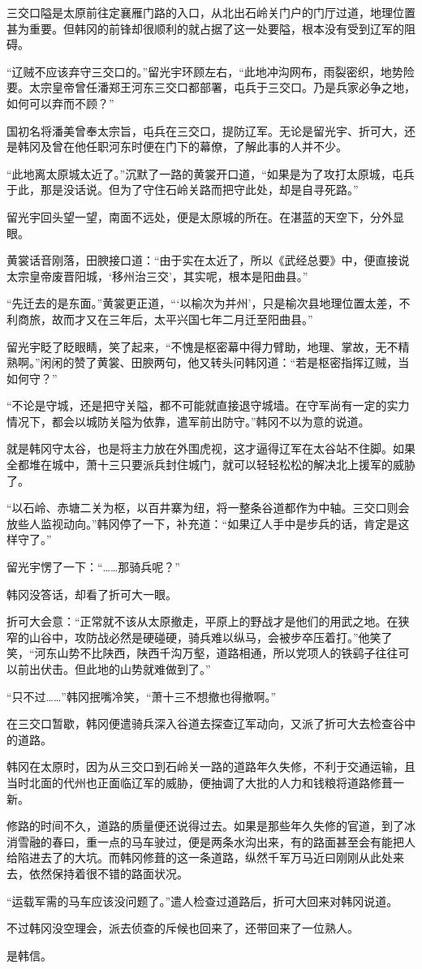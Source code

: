 三交口隘是太原前往定襄雁门路的入口，从北出石岭关门户的门厅过道，地理位置甚为重要。但韩冈的前锋却很顺利的就占据了这一处要隘，根本没有受到辽军的阻碍。

“辽贼不应该弃守三交口的。”留光宇环顾左右，“此地冲沟网布，雨裂密织，地势险要。太宗皇帝曾任潘郑王河东三交口都部署，屯兵于三交口。乃是兵家必争之地，如何可以弃而不顾？”

国初名将潘美曾奉太宗旨，屯兵在三交口，提防辽军。无论是留光宇、折可大，还是韩冈及曾在他任职河东时便在门下的幕僚，了解此事的人并不少。

“此地离太原城太近了。”沉默了一路的黄裳开口道，“如果是为了攻打太原城，屯兵于此，那是没话说。但为了守住石岭关路而把守此处，却是自寻死路。”

留光宇回头望一望，南面不远处，便是太原城的所在。在湛蓝的天空下，分外显眼。

黄裳话音刚落，田腴接口道：“由于实在太近了，所以《武经总要》中，便直接说太宗皇帝废晋阳城，‘移州治三交’，其实呢，根本是阳曲县。”

“先迁去的是东面。”黄裳更正道，“‘以榆次为并州’，只是榆次县地理位置太差，不利商旅，故而才又在三年后，太平兴国七年二月迁至阳曲县。”

留光宇眨了眨眼睛，笑了起来，“不愧是枢密幕中得力臂助，地理、掌故，无不精熟啊。”闲闲的赞了黄裳、田腴两句，他又转头问韩冈道：“若是枢密指挥辽贼，当如何守？”

“不论是守城，还是把守关隘，都不可能就直接退守城墙。在守军尚有一定的实力情况下，都会以城防关隘为依靠，遣军前出防守。”韩冈不以为意的说道。

就是韩冈守太谷，也是将主力放在外围虎视，这才逼得辽军在太谷站不住脚。如果全都堆在城中，萧十三只要派兵封住城门，就可以轻轻松松的解决北上援军的威胁了。

“以石岭、赤塘二关为枢，以百井寨为纽，将一整条谷道都作为中轴。三交口则会放些人监视动向。”韩冈停了一下，补充道：“如果辽人手中是步兵的话，肯定是这样守了。”

留光宇愣了一下：“……那骑兵呢？”

韩冈没答话，却看了折可大一眼。

折可大会意：“正常就不该从太原撤走，平原上的野战才是他们的用武之地。在狭窄的山谷中，攻防战必然是硬碰硬，骑兵难以纵马，会被步卒压着打。”他笑了笑，“河东山势不比陕西，陕西千沟万壑，道路相通，所以党项人的铁鹞子往往可以前出伏击。但此地的山势就难做到了。”

“只不过……”韩冈抿嘴冷笑，“萧十三不想撤也得撤啊。”

在三交口暂歇，韩冈便遣骑兵深入谷道去探查辽军动向，又派了折可大去检查谷中的道路。

韩冈在太原时，因为从三交口到石岭关一路的道路年久失修，不利于交通运输，且当时北面的代州也正面临辽军的威胁，便抽调了大批的人力和钱粮将道路修葺一新。

修路的时间不久，道路的质量便还说得过去。如果是那些年久失修的官道，到了冰消雪融的春曰，重一点的马车驶过，便是两条水沟出来，有的路面甚至会有能把人给陷进去了的大坑。而韩冈修葺的这一条道路，纵然千军万马近曰刚刚从此处来去，依然保持着很不错的路面状况。

“运载军需的马车应该没问题了。”遣人检查过道路后，折可大回来对韩冈说道。

不过韩冈没空理会，派去侦查的斥候也回来了，还带回来了一位熟人。

是韩信。
